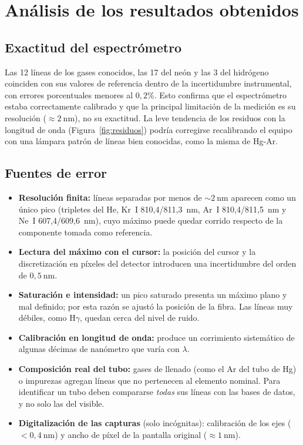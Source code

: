 \documentclass{article}
\newcommand{\nm}{\ \mathrm{nm}}
\begin{document}
\section{Análisis de los resultados obtenidos}

\subsection{Exactitud del espectrómetro}

Las 12 líneas de los gases conocidos, las 17 del neón y las 3 del hidrógeno coinciden con sus valores de referencia dentro de la incertidumbre instrumental, con errores porcentuales menores al $0,2\%$. Esto confirma que el espectrómetro estaba correctamente calibrado y que la principal limitación de la medición es su resolución ($\approx2\nm$), no su exactitud. La leve tendencia de los residuos con la longitud de onda (Figura~\ref{fig:residuos}) podría corregirse recalibrando el equipo con una lámpara patrón de líneas bien conocidas, como la misma de Hg-Ar.

\subsection{Fuentes de error}

\begin{itemize}
    \item \textbf{Resolución finita:} líneas separadas por menos de $\sim2\nm$ aparecen como un único pico (tripletes del He, Kr~I 810,4/811,3~nm, Ar~I 810,4/811,5~nm y Ne~I 607,4/609,6~nm), cuyo máximo puede quedar corrido respecto de la componente tomada como referencia.
    \item \textbf{Lectura del máximo con el cursor:} la posición del cursor y la discretización en píxeles del detector introducen una incertidumbre del orden de $0,5\nm$.
    \item \textbf{Saturación e intensidad:} un pico saturado presenta un máximo plano y mal definido; por esta razón se ajustó la posición de la fibra. Las líneas muy débiles, como H$\gamma$, quedan cerca del nivel de ruido.
    \item \textbf{Calibración en longitud de onda:} produce un corrimiento sistemático de algunas décimas de nanómetro que varía con $\lambda$.
    \item \textbf{Composición real del tubo:} gases de llenado (como el Ar del tubo de Hg) o impurezas agregan líneas que no pertenecen al elemento nominal. Para identificar un tubo deben compararse \emph{todas} sus líneas con las bases de datos, y no solo las del visible.
    \item \textbf{Digitalización de las capturas} (solo incógnitas): calibración de los ejes ($<0,4\nm$) y ancho de píxel de la pantalla original ($\approx1\nm$).
\end{itemize}
\end{document}
